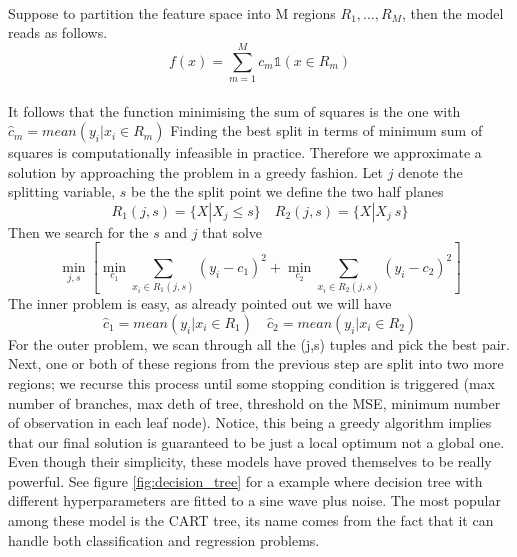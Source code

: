 \\
Suppose to partition the feature space into M regions $R_1,\dots,R_M$, then the model reads as follows.
\begin{equation}
    f(x)=\sum\limits_{m=1}^{M}c_m\mathbb{1}(x \in R_m)
\end{equation}
\\
It follows that the function minimising the sum of squares is the one with $\hat{c}_m=mean(y_i|x_i \in R_m)$
Finding the best split in terms of minimum sum of squares is computationally infeasible in practice. Therefore we approximate a solution by approaching the problem in a greedy fashion.
Let $j$ denote the splitting variable, $s$ be the the split point we define the two half planes
\begin{equation}
    R_1(j,s)=\{X|X_j\leq s\} \quad R_2(j,s)=\{X|X_j\>s\}
\end{equation}
Then we search for the $s$ and $j$ that solve
\begin{equation}
    \min_{j,s}\left[\min_{c_1} \sum\limits_{x_i \in R_1(j,s)}(y_i-c_1)^2+\min_{c_2} \sum\limits_{x_i \in R_2(j,s)}(y_i-c_2)^2\right]
\end{equation}
The inner problem is easy, as already pointed out we will have 
\begin{equation}
    \hat{c}_1=mean(y_i|x_i \in R_1) \quad \hat{c}_2=mean(y_i|x_i \in R_2)
\end{equation}
For the outer problem, we scan through all the (j,s) tuples and pick the best pair. 
Next, one or both of these regions from the previous step are split into two more regions; we recurse this process until some stopping condition is triggered (max number of branches, max deth of tree, threshold on the MSE, minimum number of observation in each leaf node).
Notice, this being a greedy algorithm implies that our final solution is guaranteed to be just a local optimum not a global one.
Even though their simplicity, these models have proved themselves to be really powerful. See figure \ref{fig:decision_tree} for a example where decision tree with different hyperparameters are fitted to a sine wave plus noise. The most popular among these model is the CART \cite{breiman2017classification} tree, its name comes from the fact that it can handle both classification and regression problems.
